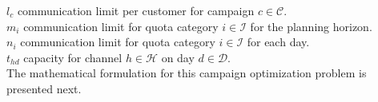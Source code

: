 \documentclass[11pt]{article}
\begin{document}
\begin{singlespace}
\noindent $l_{c}$ communication limit per customer for campaign $c \in \mathcal{C}$.\\

\noindent $m_{i}$ communication limit for quota category $i \in \mathcal{I}$ for the planning horizon.\\

\noindent $n_{i}$ communication limit for quota category $i \in \mathcal{I}$ for each day.\\

\noindent $t_{{h}{d}}$ capacity for channel $h \in \mathcal{H}$ on day $d \in \mathcal{D}$.\\

\noindent The mathematical formulation for this campaign optimization problem is presented next.
\end{singlespace}
\vspace{-0.5cm}
\end{document}
